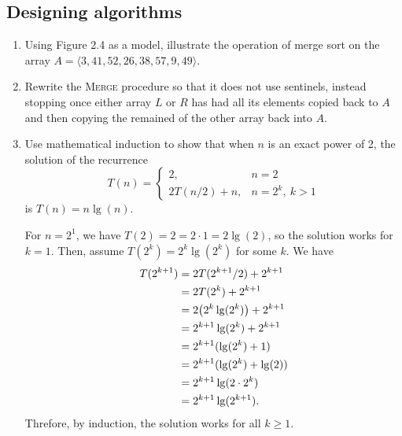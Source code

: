 \documentclass[Chapter02]{subfiles}
\begin{document}
	\subsection{Designing algorithms}

	\begin{enumerate}[leftmargin=\labelsep]
		\item Using Figure 2.4 as a model, illustrate the operation of merge sort on the array $A = \langle 3, 41, 52, 26, 38, 57, 9, 49 \rangle$.
		\begin{answer}
			
		\end{answer}

		\item Rewrite the \textsc{Merge} procedure so that it does not use sentinels, instead stopping once either array $L$ or $R$ has had all its elements copied back to $A$ and then copying the remained of the other array back into $A$.
		\begin{answer}
			
		\end{answer}

		\item Use mathematical induction to show that when $n$ is an exact power of 2, the solution of the recurrence
		\[
			T(n) = 
			\begin{cases}
				2, & n = 2\\
				2T(n / 2) + n, & n = 2^k,\ k > 1
			\end{cases}
		\]
		is $T(n) = n\lg(n)$.
		\begin{answer}
			For $n = 2^1$, we have $T(2) = 2 = 2 \cdot 1 = 2 \lg(2)$, so the solution works for $k = 1$. Then, assume $T(2^k) = 2^k \lg(2^k)$ for some $k$. We have
			\begin{align*}
				T(2^{k + 1}) &= 2T(2^{k+1} / 2) + 2^{k + 1}\\
					&=  2T(2^k) + 2^{k + 1}\\
					&= 2\qty(2^k \lg(2^k)) + 2^{k + 1}\\
					&= 2^{k + 1} \lg(2^k) + 2^{k + 1}\\
					&= 2^{k + 1}(\lg(2^k) + 1)\\
					&= 2^{k + 1}(\lg(2^k) + \lg(2))\\
					&= 2^{k + 1}\lg(2 \cdot 2^k)\\
					&= 2^{k + 1}\lg(2^{k + 1}).
			\end{align*}
			Threfore, by induction, the solution works for all $k \geq 1$.
		\end{answer}


\end{enumerate}
\end{document}
